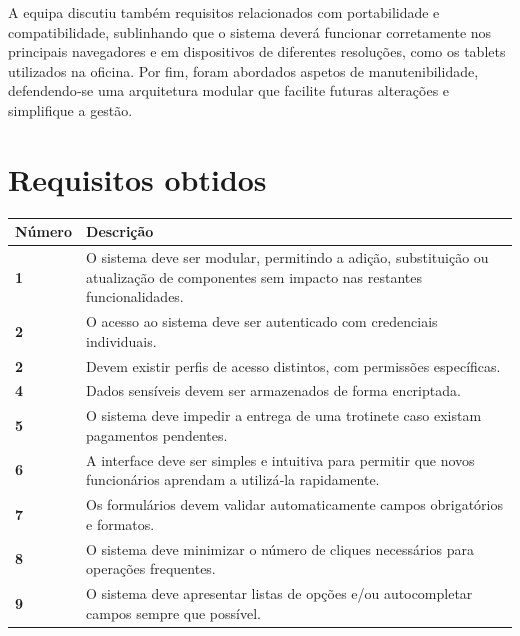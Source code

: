 \documentclass[12pt]{article}
\begin{document}
A equipa discutiu também requisitos relacionados com portabilidade e compatibilidade, sublinhando que o sistema deverá funcionar corretamente nos principais navegadores e em dispositivos de diferentes resoluções, como os tablets utilizados na oficina. Por fim, foram abordados aspetos de manutenibilidade, defendendo‑se uma arquitetura modular que facilite futuras alterações e simplifique a gestão.

\vspace{0.5cm}

\section*{Requisitos obtidos}
	
\begin{tabularx}{\textwidth}{@{}|l|X|@{}}
\hline
\rowcolor{gray!10} \textbf{Número} & \textbf{Descrição} \\ \hline


\textbf{1} & O sistema deve ser modular, permitindo a adição, substituição ou atualização de componentes sem impacto nas restantes funcionalidades. \\ \hline

\textbf{2} & O acesso ao sistema deve ser autenticado com credenciais individuais. \\ \hline

\textbf{2} & Devem existir perfis de acesso distintos, com permissões específicas. \\ \hline

\textbf{4} & Dados sensíveis devem ser armazenados de forma encriptada. \\ \hline

\textbf{5} & O sistema deve impedir a entrega de uma trotinete caso existam pagamentos pendentes. \\ \hline

\textbf{6} & A interface deve ser simples e intuitiva para permitir que novos funcionários aprendam a utilizá‑la rapidamente. \\ \hline

\textbf{7} & Os formulários devem validar automaticamente campos obrigatórios e formatos. \\ \hline

\textbf{8} & O sistema deve minimizar o número de cliques necessários para operações frequentes. \\ \hline

\textbf{9} & O sistema deve apresentar listas de opções e/ou autocompletar campos sempre que possível. \\ \hline


\end{tabularx}
\end{document}
